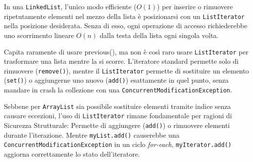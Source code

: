 \begin{table}[ht]
\centering
{}
\caption{Metodi principali di ListIterator}
\end{table}

\begin{warningbox}
In una \texttt{LinkedList}, l'unico modo efficiente ($O(1)$) per inserire o rimuovere ripetutamente elementi nel mezzo della lista è posizionarsi con un \texttt{ListIterator} nella posizione desiderata. Senza di esso, ogni operazione di accesso richiederebbe uno scorrimento lineare $O(n)$ dalla testa della lista ogni singola volta. 
\end{warningbox}

\begin{tip}
    Capita raramente di usare previous(), ma non è così raro usare \texttt{ListIterator} per trasformare una lista mentre la si scorre.
    L'iteratore standard permette solo di rimuovere (\texttt{remove()}), mentre il \texttt{ListIterator} permette di sostituire un elemento (\texttt{set()}) o aggiungerne uno nuovo (\texttt{add()}) esattamente in quel punto, senza mandare in crash la collezione con una \texttt{ConcurrentModificationException}.
\end{tip}

\begin{tip}
    Sebbene per \texttt{ArrayList} sia possibile sostituire elementi tramite indice senza causare eccezioni, l'uso di \texttt{ListIterator} rimane fondamentale per ragioni di {Sicurezza Strutturale}: Permette di aggiungere (\texttt{add()}) o rimuovere elementi durante l'iterazione. Mentre \texttt{myList.add()} causerebbe una \texttt{ConcurrentModificationException} in un ciclo \textit{for-each}, \texttt{myIterator.add()} aggiorna correttamente lo stato dell'iteratore.
\end{tip}

